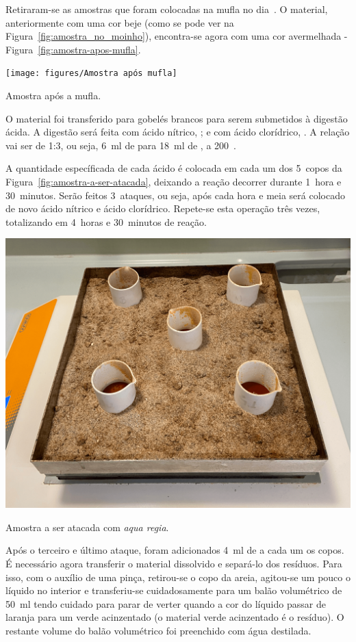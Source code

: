 Retiraram-se as amostras que foram colocadas na mufla no dia~.
O material, anteriormente com uma cor beje (como se pode ver na Figura~\ref{fig:amostra_no_moinho}), encontra-se agora com uma cor avermelhada - Figura~\ref{fig:amostra-apos-mufla}.

\begin{marginfigure}[0.25cm]
    \centering
    \texttt{[image: figures/Amostra após mufla]}
    \caption{Amostra após a mufla.}
    \label{fig:amostra-apos-mufla}
\end{marginfigure}

O material foi transferido para gobelés brancos para serem submetidos à digestão ácida.
A digestão será feita com ácido nítrico, ; e com ácido clorídrico, .
A relação vai ser de 1:3, ou seja, 6~ml de  para 18~ml de , a 200~\graus.

A quantidade específicada de cada ácido é colocada em cada um dos 5~copos da Figura~\ref{fig:amostra-a-ser-atacada}, deixando a reação decorrer durante 1~hora e 30~minutos.
Serão feitos 3~ataques, ou seja, após cada hora e meia será colocado de novo ácido nítrico e ácido clorídrico.
Repete-se esta operação três vezes, totalizando em 4~horas e 30~minutos de reação.

\begin{marginfigure}[2\baselineskip]
    \centering
    \includegraphics[width=0.9\linewidth]{figures/Amostra a ser atacada - digestão ácida}
    \caption{Amostra a ser atacada com \emph{aqua regia}.}
    \label{fig:amostra-a-ser-atacada}
\end{marginfigure}

Após o terceiro e último ataque, foram adicionados 4~ml de  a cada um os copos.
É necessário agora transferir o material dissolvido e separá-lo dos resíduos.
Para isso, com o auxílio de uma pinça, retirou-se o copo da areia, agitou-se um pouco o líquido no interior e transferiu-se cuidadosamente para um balão volumétrico de 50~ml tendo cuidado para parar de verter quando a cor do líquido passar de laranja para um verde acinzentado (o material verde acinzentado é o resíduo).
O restante volume do balão volumétrico foi preenchido com água destilada.


